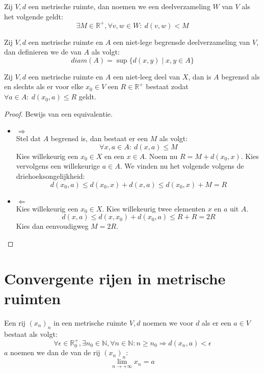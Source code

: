 \documentclass[main.tex]{subfiles}
\begin{document}
\begin{de}
  \label{de:metrische-ruimte-begrensde-verzameling}
  Zij $V,d$ een metrische ruimte, dan noemen we een deelverzameling $W$ van $V$  als het volgende geldt:
  \[ \exists M\in \mathbb{R}^{+}, \forall v,w\in W:\ d(v,w) < M \]
\end{de}

\begin{de}
  Zij $V,d$ een metrische ruimte en $A$ een niet-lege begrensde deelverzameling van $V$, dan definieren we de  van $A$ als volgt:
  \[ diam(A) = \sup\{d(x,y) \mid x,y \in A \} \]
\end{de}

\begin{bpr}
  Zij $V,d$ een metrische ruimte en $A$ een niet-leeg deel van $X$, dan is $A$ begrensd als en slechts als er voor elke $x_{0}\in V$ een $R\in \mathbb{R}^{+}$ bestaat zodat $\forall a\in A:\ d(x_{0},a) \le R$ geldt.

  \begin{proof}
    Bewijs van een equivalentie.
    \begin{itemize}
    \item $\Rightarrow$\\
      Stel dat $A$ begrensd is, dan bestaat er een $M$ als volgt:
      \[ \forall x,a \in A:\ d(x,a) \le M \]
      Kies willekeurig een $x_{0}\in X$ en een $x\in A$.
      Noem nu $R=M + d(x_{0},x)$.
      Kies vervolgens een willekeurige $a\in A$.
      We vinden nu het volgende volgens de driehoeksongelijkheid:
      \[ d(x_{0},a) \le d(x_{0},x) + d(x,a) \le d(x_{0},x) + M = R \]
    \item $\Leftarrow$\\
      Kies willekeurig een $x_{0}\in X$.
      Kies willekeurig twee elementen $x$ en $a$ uit $A$.
      \[ d(x,a) \le d(x,x_{0}) + d(x_{0},a) \le R + R = 2R\]
      Kies dan eenvoudigweg $M=2R$.
    \end{itemize}
  \end{proof}
\end{bpr}

\section{Convergente rijen in metrische ruimten}
\label{sec:rijen-metr-ruimt}

\begin{de}
  Een rij $(x_{n})_{n}$ in een metrische ruimte $V,d$ noemen we  voor $d$ als er een $a\in V$ bestaat als volgt:
  \[ \forall \epsilon\in\mathbb{R}_{0}^{+}, \exists n_{0}\in \mathbb{N}, \forall n\in \mathbb{N}: n \ge n_{0} \Rightarrow d(x_{n},a) < \epsilon \]
  $a$ noemen we dan de  van de rij $(x_{n})_{n}$:
  \[ \lim_{n\rightarrow +\infty}x_{n} = a \]
\end{de}
\end{document}
